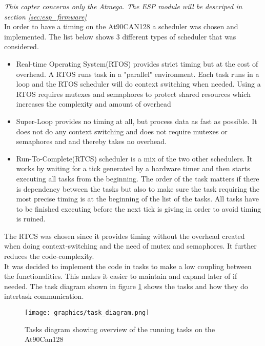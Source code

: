 \textit{This capter concerns only the Atmega.  The ESP module will be descriped in section \ref{sec:esp_firmware}} \\
In order to have a timing on the At90CAN128 a scheduler was chosen and implemented.
The list below shows 3 different types of scheduler that was considered.
\begin{itemize}
	\item Real-time Operating System(RTOS) provides strict timing but at the cost of overhead. A RTOS runs task in a "parallel" environment. Each task runs in a loop and the RTOS scheduler will do context switching when needed. Using a RTOS requires mutexes and semaphores to protect shared resources which increases the complexity and amount of overhead
	\item Super-Loop provides no timing at all, but process data as fast as possible. It does not do any context switching and does not require mutexes or semaphores and  and thereby takes no overhead.
	\item Run-To-Complete(RTCS) scheduler is a mix of the two other schedulers. It works by waiting for a tick generated by a hardware timer and then starts executing all tasks from the beginning. The order of the task matters if there is dependency between the tasks but also to make sure the task requiring the most precise timing is at the beginning of the list of the tasks. All tasks have to be finished executing before the next tick is giving in order to avoid timing is ruined.
\end{itemize}
The RTCS was chosen since it provides timing without the overhead created when doing context-switching and the need of mutex and semaphores. It further reduces the code-complexity.\\

It was decided to implement the code in tasks to make a low coupling between the functionalities. This makes it easier to maintain and expand later of if needed. The task diagram shown in figure \ref{fig:task_diagram_atmega} shows the tasks and how they do intertask communication.


\begin{figure}[H]
    \center
    \texttt{[image: graphics/task\_diagram.png]}
  \label{fig:task_diagram_atmega}
  \caption{Tasks diagram showing overview of the running tasks on the At90Can128}
\end{figure}



